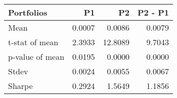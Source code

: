 \begin{tabular}{lrrr}
\toprule
Portfolios & P1 & P2 & P2 - P1 \\
\midrule
Mean & 0.0007 & 0.0086 & 0.0079 \\
t-stat of mean & 2.3933 & 12.8089 & 9.7043 \\
p-value of mean & 0.0195 & 0.0000 & 0.0000 \\
Stdev & 0.0024 & 0.0055 & 0.0067 \\
Sharpe & 0.2924 & 1.5649 & 1.1856 \\
\bottomrule
\end{tabular}
